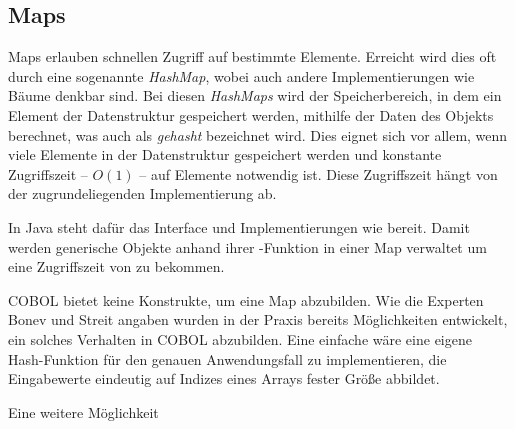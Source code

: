 \subsection{Maps}
Maps erlauben schnellen Zugriff auf bestimmte Elemente. Erreicht wird dies oft durch eine sogenannte \textit{HashMap}, wobei auch andere Implementierungen wie Bäume denkbar sind. Bei diesen \textit{HashMaps} wird der Speicherbereich, in dem ein Element der Datenstruktur gespeichert werden, mithilfe der Daten des Objekts berechnet, was auch als \textit{gehasht} bezeichnet wird. Dies eignet sich vor allem, wenn viele Elemente in der Datenstruktur gespeichert werden und konstante Zugriffszeit -- $O(1)$ -- auf Elemente notwendig ist. Diese Zugriffszeit hängt von der zugrundeliegenden Implementierung ab.

In Java steht dafür das Interface  und Implementierungen wie  bereit. Damit werden generische Objekte anhand ihrer -Funktion in einer Map verwaltet um eine Zugriffszeit von zu bekommen. 

COBOL bietet keine Konstrukte, um eine Map abzubilden. Wie die Experten Bonev und Streit angaben wurden in der Praxis bereits Möglichkeiten entwickelt, ein solches Verhalten in COBOL abzubilden. Eine einfache wäre eine eigene Hash-Funktion für den genauen Anwendungsfall zu implementieren, die Eingabewerte eindeutig auf Indizes eines Arrays fester Größe abbildet. 

Eine weitere Möglichkeit 